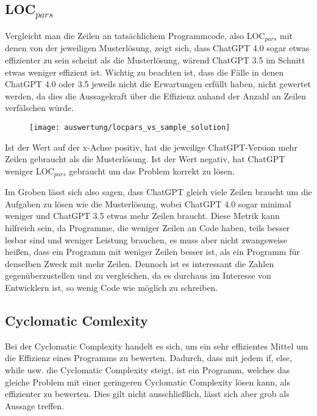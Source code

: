 \documentclass[class=scrbook, crop=false]{standalone}
\begin{document}
    \subsection{LOC$_{pars}$}
    Vergleicht man die Zeilen an tatsächlichem Programmcode, also LOC$_{pars}$ mit denen von der jeweiligen Musterlösung,
    zeigt sich, dass ChatGPT 4.0 sogar etwas effizienter zu sein scheint als die Musterlösung, wärend ChatGPT 3.5 im Schnitt etwas weniger effizient ist.
    Wichtig zu beachten ist, dass die Fälle in denen ChatGPT 4.0 oder 3.5 jeweils nicht die Erwartungen erfüllt haben, nicht
    gewertet werden, da dies die Aussagekraft über die Effizienz anhand der Anzahl an Zeilen verfälschen würde.
    \begin{figure}[H]
        \centering
        \texttt{[image: auswertung/locpars\_vs\_sample\_solution]}
        \caption{}
        \label{fig:3}
    \end{figure}
    Ist der Wert auf der x-Achse positiv, hat die jeweilige ChatGPT-Version mehr Zeilen gebraucht als die Musterlösung.
    Ist der Wert negativ, hat ChatGPT weniger LOC$_{pars}$ gebraucht um das Problem korrekt zu lösen.

    Im Groben lässt sich also sagen, dass ChatGPT gleich viele Zeilen braucht um die Aufgaben zu lösen wie die Musterlösung, wobei ChatGPT 4.0 sogar
    minimal weniger und ChatGPT 3.5 etwas mehr Zeilen braucht.
    Diese Metrik kann hilfreich sein, da Programme, die weniger Zeilen an Code haben, teils besser lesbar sind und weniger
    Leistung brauchen, es muss aber nicht zwangsweise heißen, dass ein Programm mit weniger Zeilen besser ist, als ein
    Programm für denselben Zweck mit mehr Zeilen.
    Dennoch ist es interessant die Zahlen gegenüberzustellen und zu vergleichen, da es durchaus im Interesse von Entwicklern ist,
    so wenig Code wie möglich zu schreiben.

    \subsection{Cyclomatic Comlexity}
    Bei der Cyclomatic Complexity handelt es sich, um ein sehr effizientes Mittel um die Effizienz eines Programms zu bewerten.
    Dadurch, dass mit jedem if, else, while usw. die Cyclomatic Complexity steigt, ist ein Programm, welches das gleiche
    Problem mit einer geringeren Cyclomatic Complexity lösen kann, als effizienter zu bewerten. Dies gilt nicht ausschließlich,
    lässt sich aber grob als Aussage treffen.
\end{document}
